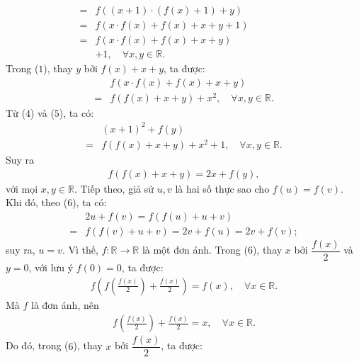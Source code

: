 \begin{multicols}{2}
\begin{align*}
		= &f\left( {\left( {x + 1} \right) \cdot \left( {f\left( x \right) + 1} \right) + y} \right)\\
		=& f\left( {x \cdot f\left( x \right) + f\left( x \right) + x + y + 1} \right)\quad\quad\quad\quad\\
		=& f\left( {x \cdot f\left( x \right) + f\left( x \right) + x + y} \right)\\
		&+ 1, \quad\forall x, y \in \mathbb{R}.\tag{$4$}
	\end{align*}
	Trong ($1$), thay $y$ bởi $f(x) + x +y$,  ta được:
	\begin{align*}
		&f\left( {x \cdot f\left( x \right) + f\left( x \right) + x + y} \right)\\
		= &f\left( {f\left( x \right) + x + y} \right) + {x^2}, \quad\forall x,y \in \mathbb{R}. \tag{$5$}
	\end{align*}
	Từ ($4$) và ($5$), ta có:
	\begin{align*}
			&{\left( {x + 1} \right)^2} + f\left( y \right) \\
			= &f\left( {f\left( x \right) + x + y} \right) + {x^2} + 1, \quad \forall x,y \in \mathbb{R}.
	\end{align*}
	Suy ra
	\begin{align*}
		f\left( {f\left( x \right) + x + y} \right) = 2x + f\left( y \right), \tag{$6$}
	\end{align*}
	với mọi $x,y \in \mathbb{R}$.
	\vskip 0.05cm
	Tiếp theo, giả sử $u, v$ là hai số thực sao cho $f(u) = f(v)$. Khi đó, theo ($6$), ta có:
	\begin{align*}
		&2u + f\left( v \right) = f\left( {f\left( u \right) + u + v} \right) \\
		= &f\left( {f\left( v \right) \!+\! u \!+\! v} \right) \!=\! 2v +\! f\left( u \right) \!=\! 2v +\! f\left( v \right);
	\end{align*}
	suy ra, $u = v$. Vì thế, $f: \mathbb{R} \to \mathbb{R}$ là một đơn ánh.
	\vskip 0.05cm
	Trong ($6$), thay $x$ bởi $\dfrac{f(x)}{2}$  và $y = 0$, với lưu ý $f(0)=0$,  ta được:
	\begin{align*}
		f\left( {f\left( {\frac{{f\left( x \right)}}{2}} \right) + \frac{{f\left( x \right)}}{2}} \right) = f\left( x \right), \quad\forall x \in \mathbb{R}.
	\end{align*}
	Mà $f$ là đơn ánh, nên
	\begin{align*}
		f\left( {\frac{{f\left( x \right)}}{2}} \right) + \frac{{f\left( x \right)}}{2} = x, \quad\forall x \in \mathbb{R}.
	\end{align*}
	Do đó, trong ($6$), thay $x$ bởi  $\dfrac{f(x)}{2}$, ta được:

\end{multicols}
